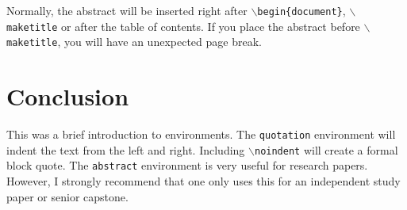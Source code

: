 \documentclass{article}
\begin{document}
Normally, the abstract will be inserted right after \texttt{$\backslash$begin\{document\}}, \texttt{$\backslash$maketitle} or after the table of contents. If you place the abstract before \texttt{$\backslash$maketitle}, you will have an unexpected page break.


\section{Conclusion}

This was a brief introduction to environments. The \texttt{quotation} environment will indent the text from the left and right. Including \texttt{$\backslash$noindent} will create a formal block quote. The \texttt{abstract} environment is very useful for research papers. However, I strongly recommend that one only uses this for an independent study paper or senior capstone.
\end{document}
